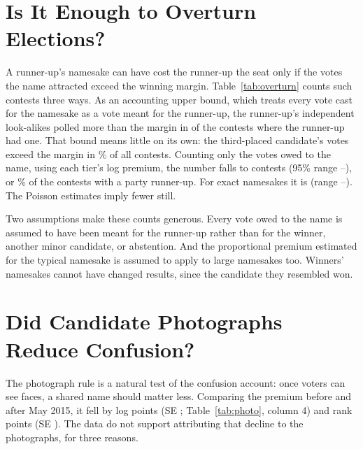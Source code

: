\documentclass[11pt]{article}
\begin{document}
\section{Is It Enough to Overturn Elections?}

A runner-up's namesake can have cost the runner-up the seat only if the votes the name attracted exceed the winning margin. Table~\ref{tab:overturn} counts such contests three ways. As an accounting upper bound, which treats every vote cast for the namesake as a vote meant for the runner-up, the runner-up's independent look-alikes polled more than the margin in \ovLookBound{} of the \ovLookHas{} contests where the runner-up had one. That bound means little on its own: the third-placed candidate's votes exceed the margin in \thirdOver\% of all contests. Counting only the votes owed to the name, using each tier's log premium, the number falls to \ovLookPoint{} contests (95\% range \ovLookLow--\ovLookHigh), or \ovLookPointPct\% of the \nMarginContests{} contests with a party runner-up. For exact namesakes it is \ovExactPoint{} (range \ovExactLow--\ovExactHigh). The Poisson estimates imply fewer still.

Two assumptions make these counts generous. Every vote owed to the name is assumed to have been meant for the runner-up rather than for the winner, another minor candidate, or abstention. And the proportional premium estimated for the typical namesake is assumed to apply to large namesakes too. Winners' namesakes cannot have changed results, since the candidate they resembled won.

\begin{table}[htbp]
\centering\small
\caption{Contests in which a runner-up's independent namesakes polled more than the winning margin.}
\label{tab:overturn}

\end{table}

\section{Did Candidate Photographs Reduce Confusion?}

The photograph rule is a natural test of the confusion account: once voters can see faces, a shared name should matter less. Comparing the premium before and after May 2015, it fell by \phLgPost{} log points (SE \phLgPostSe; Table~\ref{tab:photo}, column 4) and \phRkPost{} rank points (SE \phRkPostSe). The data do not support attributing that decline to the photographs, for three reasons.
\end{document}
